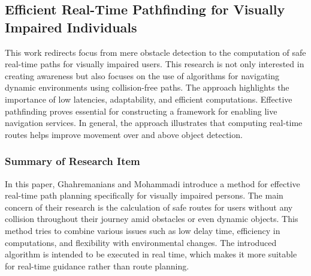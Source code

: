 \documentclass{FastFyp}
\begin{document}
\subsection{Efficient Real-Time Pathfinding for Visually Impaired Individuals}
This work redirects focus from mere obstacle detection to the computation of safe real-time paths for visually impaired users. This research is not only interested in creating awareness but also focuses on the use of algorithms for navigating dynamic environments using collision-free paths. The approach highlights the importance of low latencies, adaptability, and efficient computations. Effective pathfinding proves essential for constructing a framework for enabling live navigation services. In general, the approach illustrates that computing real-time routes helps improve movement over and above object detection.
\subsubsection{Summary of Research Item}  
In this paper, Ghahremanians and Mohammadi \cite{ref:ghahremanians2025efficient} introduce a method for effective real-time path planning specifically for visually impaired persons. The main concern of their research is the calculation of safe routes for users without any collision throughout their journey amid obstacles or even dynamic objects. This method tries to combine various issues such as low delay time, efficiency in computations, and flexibility with environmental changes. The introduced algorithm is intended to be executed in real time, which makes it more suitable for real-time guidance rather than route planning.
\end{document}
